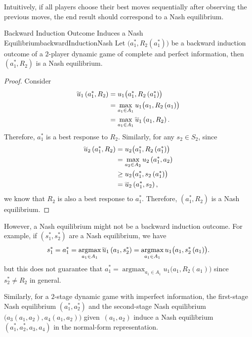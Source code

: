 \documentclass[math]{amznotes}
\renewcommand\widetilde[1]{\ThisStyle{%
  \setbox0=\hbox{$\SavedStyle#1$}%
  \stackengine{1pt-\LMpt}{$\SavedStyle#1$}{%
    \stretchto{\scaleto{\SavedStyle\mkern.2mu\sim}{.5467\wd0}}{.5\ht0}%
  }{O}{c}{F}{T}{S}%
}}
\theoremstyle{remark}
\DeclareMathOperator*{\argmax}{argmax}
\begin{document}
Intuitively, if all players choose their best moves sequentially after observing the previous moves, the end result should correspond to a Nash equilibrium.
\begin{probox}{Backward Induction Outcome Induces a Nash Equilibrium}{backwardInductionNash}
    Let $\bigl(a_1^*, R_2\left(a_1^*\right)\bigr)$ be a backward induction outcome of a $2$-player dynamic game of complete and perfect information, then $\left(a_1^*, R_2\right)$ is a Nash equilibrium.
    \tcblower
    \begin{proof}
        Consider 
        \begin{align*}
            \widetilde{u}_1\left(a_1^*, R_2\right) & = u_1\bigl(a_1^*, R_2\left(a_1^*\right)\bigr) \\
            & = \max_{a_1 \in A_1} u_1\bigl(a_1, R_2\left(a_1\right)\bigr) \\
            & = \max_{a_1 \in A_1} \widetilde{u}_1\left(a_1, R_2\right).
        \end{align*}
        Therefore, $a_1^*$ is a best response to $R_2$. Similarly, for any $s_2 \in S_2$, since
        \begin{align*}
            \widetilde{u}_2\left(a_1^*, R_2\right) & = u_2\bigl(a_1^*, R_2\left(a_1^*\right)\bigr) \\
            & = \max_{a_2 \in A_2} u_2\left(a_1^*, a_2\right) \\
            & \geq u_2\bigl(a_1^*, s_2\left(a_1^*\right)\bigr) \\
            & = \widetilde{u}_2\left(a_1^*, s_2\right),           
        \end{align*}
        we know that $R_2$ is also a best response to $a_1^*$. Therefore, $\left(a_1^*, R_2\right)$ is a Nash equilibrium.
    \end{proof}
\end{probox}
However, a Nash equilibrium might not be a backward induction outcome. For example, if $\left(s_1^*, s_2^*\right)$ are a Nash equilibrium, we have
\begin{equation*}
    s_1^* = a_1^* = \argmax_{a_1 \in A_1}\widetilde{u}_1\left(a_1, s_2^*\right) = \argmax_{a_1 \in A_1}u_1\bigl(a_1, s_2^*\left(a_1\right)\bigr).
\end{equation*}
but this does not guarantee that $a_1^* = \argmax_{a_1 \in A_1}u_1\bigl(a_1, R_2\left(a_1\right)\bigr)$ since $s_2^* \neq R_2$ in general.

Similarly, for a $2$-stage dynamic game with imperfect information, the first-stage Nash equilibrium $\left(a_1^*, a_2^*\right)$ and the second-stage Nash equilibrium $\bigl(a_3\left(a_1, a_2\right), a_4\left(a_1, a_2\right)\bigr)$ given~$\left(a_1, a_2\right)$ induce a Nash equilibrium $\left(a_1^*, a_2^*, a_3, a_4\right)$ in the normal-form representation.
\end{document}
